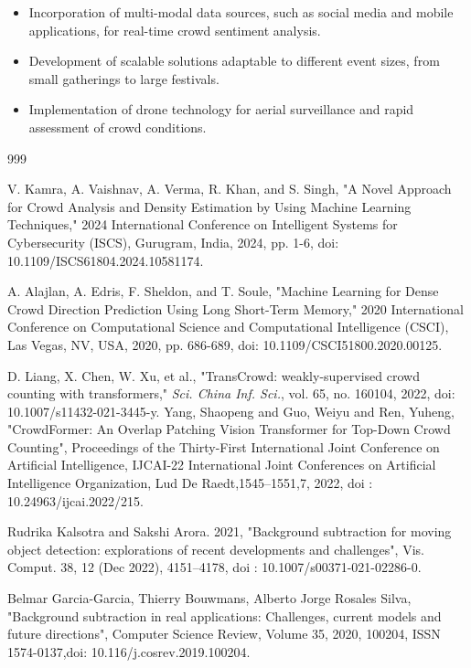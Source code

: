 \documentclass[11pt]{report}
\begin{document}
\begin{itemize}
    \item Incorporation of multi-modal data sources, such as social media and mobile applications, for real-time crowd sentiment analysis.
    \item Development of scalable solutions adaptable to different event sizes, from small gatherings to large festivals.
    \item Implementation of drone technology for aerial surveillance and rapid assessment of crowd conditions.
\end{itemize}

\begin{thebibliography}{999}

    V. Kamra, A. Vaishnav, A. Verma, R. Khan, and S. Singh, "A Novel Approach for Crowd Analysis and Density Estimation by Using Machine Learning Techniques," 2024 International Conference on Intelligent Systems for Cybersecurity (ISCS), Gurugram, India, 2024, pp. 1-6, doi: 10.1109/ISCS61804.2024.10581174.
    
    A. Alajlan, A. Edris, F. Sheldon, and T. Soule, "Machine Learning for Dense Crowd Direction Prediction Using Long Short-Term Memory," 2020 International Conference on Computational Science and Computational Intelligence (CSCI), Las Vegas, NV, USA, 2020, pp. 686-689, doi: 10.1109/CSCI51800.2020.00125.
    
    D. Liang, X. Chen, W. Xu, et al., "TransCrowd: weakly-supervised crowd counting with transformers," \textit{Sci. China Inf. Sci.}, vol. 65, no. 160104, 2022, doi: 10.1007/s11432-021-3445-y.
    Yang, Shaopeng and Guo, Weiyu and Ren, Yuheng, "CrowdFormer: An Overlap Patching Vision Transformer for Top-Down Crowd Counting",  Proceedings of the Thirty-First International Joint Conference on Artificial Intelligence, {IJCAI-22} International Joint Conferences on Artificial Intelligence Organization, Lud De Raedt,1545--1551,7, 2022, doi : 10.24963/ijcai.2022/215.

    Rudrika Kalsotra and Sakshi Arora. 2021, "Background subtraction for moving object detection: explorations of recent developments and challenges", Vis. Comput. 38, 12 (Dec 2022), 4151–4178, doi : 10.1007/s00371-021-02286-0.

    Belmar Garcia-Garcia, Thierry Bouwmans, Alberto Jorge Rosales Silva, "Background subtraction in real applications: Challenges, current models and future directions", Computer Science Review, Volume 35, 2020, 100204, ISSN 1574-0137,doi: 10.116/j.cosrev.2019.100204.
    

\end{thebibliography}
\end{document}
